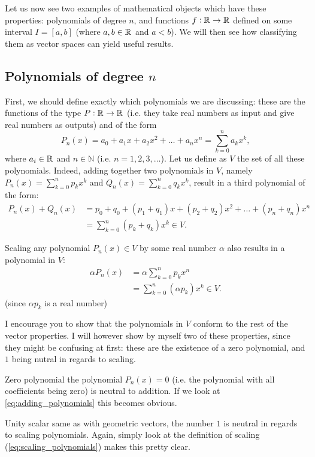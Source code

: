 Let us now see two examples of mathematical objects which have these properties: polynomials of degree $n$, and functions $f:\mathbb{R}^{}\to\mathbb{R}^{}$ defined on some interval $I=[a,b]$ (where $a,b\in\mathbb{R}^{}$ and $a<b$). We will then see how classifying them as vector spaces can yield useful results.

\subsection{Polynomials of degree $n$}
First, we should define exactly which polynomials we are discussing: these are the functions of the type $P:\mathbb{R}^{}\to\mathbb{R}^{}$ (i.e. they take real numbers as input and give real numbers as outputs) and of the form
\begin{equation}
    P_{n}(x) = a_{0} + a_{1}x + a_{2}x^{2} + \dots + a_{n}x^{n} = \displaystyle\sum_{k=0}^{n}a_{k}x^{k},
    \label{eq:polynomials_for_analysis}
\end{equation}
where $a_{i}\in\mathbb{R}^{}$ and $n\in\mathbb{N}$ (i.e. $n=1,2,3,\dots$). Let us define as $V$ the set of all these polynomials. Indeed, adding together two polynomials in $V$, namely $P_{n}(x)=\displaystyle\sum_{k=0}^{n}p_{k}x^{k}$ and $Q_{n}(x)=\displaystyle\sum_{k=0}^{n}q_{k}x^{k}$, result in a third polynomial of the form:
\begin{align}
    P_{n}(x) + Q_{n}(x) &= p_{0}+q_{0} + \left(p_{1}+q_{1}\right)x + \left(p_{2}+q_{2}\right)x^{2} + \dots + \left(p_{n}+q_{n}\right)x^{n}\\\nonumber
                        &= \displaystyle\sum_{k=0}^{n}\left(p_{k}+q_{k}\right)x^{k}\in V.
    \label{eq:adding_polynomials}
\end{align}

Scaling any polynomial $P_{n}(x)\in V$ by some real number $\alpha$ also results in a polynomial in $V$:
\begin{align}
    \alpha P_{n}(x) &= \alpha \displaystyle\sum_{k=0}^{n}p_{k}x^{n}\\\nonumber
                    &= \displaystyle\sum_{k=0}^{n}(\alpha p_{k})x^{k} \in V.
    \label{eq:scaling_polynomials}
\end{align}
(since $\alpha p_{k}$ is a real number)

I encourage you to show that the polynomials in $V$ conform to the rest of the vector properties. I will however show by myself two of these properties, since they might be confusing at first: these are the existence of a zero polynomial, and $1$ being nutral in regards to scaling.
\begin{descitemize}
    \item[Zero polynomial] the polynomial $P_{n}(x) = 0$ (i.e. the polynomial with all coefficients being zero) is neutral to addition. If we look at \cref{eq:adding_polynomials} this becomes obvious.
    \item[Unity scalar] same as with geometric vectors, the number $1$ is neutral in regards to scaling polynomials. Again, simply look at the definition of scaling (\cref{eq:scaling_polynomials}) makes this pretty clear.
\end{descitemize}

